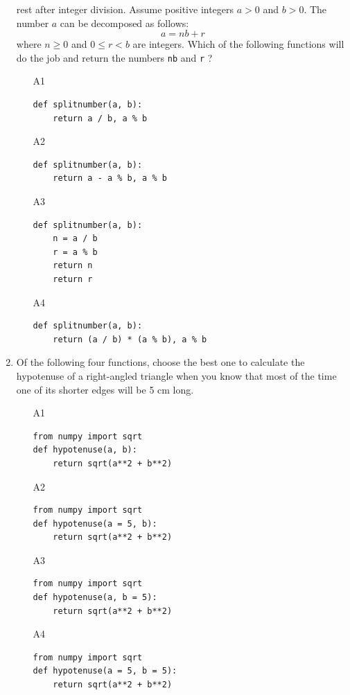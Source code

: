 \begin{enumerate}
      rest after integer division. Assume positive integers $a > 0$ and $b > 0$.
      The number $a$ can be decomposed as follows:
      $$
      a = nb + r
      $$  
      where $n \ge 0$ and $0 \le r < b$ are integers.
      Which of the following functions will do the job
      and return the numbers {\tt nb} and {\tt r} ?
\begin{enumerate}
\item[A1] 
\begin{verbatim}
def splitnumber(a, b):
    return a / b, a % b
\end{verbatim}
\item[A2] 
\begin{verbatim}
def splitnumber(a, b):
    return a - a % b, a % b
\end{verbatim}
\item[A3] 
\begin{verbatim}
def splitnumber(a, b):
    n = a / b
    r = a % b
    return n
    return r
\end{verbatim}
\item[A4] 
\begin{verbatim}
def splitnumber(a, b):
    return (a / b) * (a % b), a % b
\end{verbatim}
\end{enumerate}
\item Of the following four functions, choose the best one to calculate the hypotenuse
      of a right-angled triangle when you know that most of the time one of its shorter
      edges will be 5 cm long.
\begin{enumerate}
\item[A1] 
\begin{verbatim}
from numpy import sqrt
def hypotenuse(a, b):
    return sqrt(a**2 + b**2)
\end{verbatim}
\item[A2] 
\begin{verbatim}
from numpy import sqrt
def hypotenuse(a = 5, b):
    return sqrt(a**2 + b**2)
\end{verbatim}
\item[A3] 
\begin{verbatim}
from numpy import sqrt
def hypotenuse(a, b = 5):
    return sqrt(a**2 + b**2)
\end{verbatim}
\item[A4] 
\begin{verbatim}
from numpy import sqrt
def hypotenuse(a = 5, b = 5):
    return sqrt(a**2 + b**2)
\end{verbatim}
\end{enumerate}
\end{enumerate}

